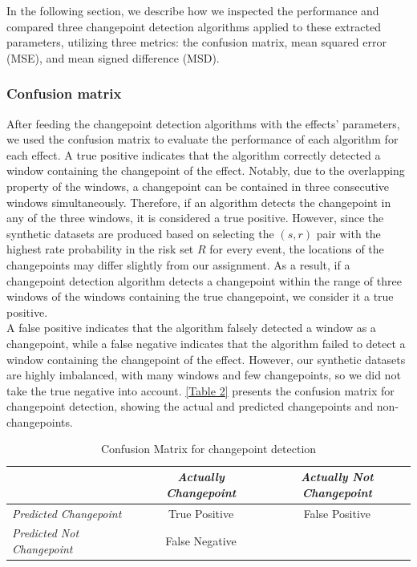 \documentclass[]{interact}
\theoremstyle{plain}%
\theoremstyle{definition}
\theoremstyle{remark}
\begin{document}
{	In the following section, we describe how we inspected the performance and compared three changepoint detection algorithms applied to these extracted parameters, utilizing three metrics: the confusion matrix, mean squared error (MSE), and mean signed difference (MSD). %
	
	\subsubsection{Confusion matrix}
	
	\hspace{0.28cm} After feeding the changepoint detection algorithms with the effects' parameters, we used the confusion matrix to evaluate the performance of each algorithm for each effect. A true positive indicates that the algorithm correctly detected a window containing the changepoint of the effect. Notably, due to the overlapping property of the windows, a changepoint can be contained in three consecutive windows simultaneously. Therefore, if an algorithm detects the changepoint in any of the three windows, it is considered a true positive. However, since the synthetic datasets are produced based on selecting the $(s,r)$ pair with the highest rate probability in the risk set $R$ for every event, the locations of the changepoints may differ slightly from our assignment. As a result, if a changepoint detection algorithm detects a changepoint within the range of three windows of the windows containing the true changepoint, we consider it a true positive. \\
	
	A false positive indicates that the algorithm falsely detected a window as a changepoint, while a false negative indicates that the algorithm failed to detect a window containing the changepoint of the effect. However, our synthetic datasets are highly imbalanced, with many windows and few changepoints, so we did not take the true negative into account. \autoref{Table 2} presents the confusion matrix for changepoint detection, showing the actual and predicted changepoints and non-changepoints. \\
	
	\begin{table}[h]
	\centering
	\renewcommand{\arraystretch}{1.5} %
	\small
	\begin{tabular}{l|c|c}
		\hline
		& \textit{Actually Changepoint} & \textit{Actually Not Changepoint}                   \\ \hline
		\textit{Predicted Changepoint} & True Positive              & False Positive                               \\ \hline
		\textit{Predicted Not Changepoint} & False Negative             & \multicolumn{1}{l}{\cellcolor[HTML]{C0C0C0}} \\ \hline
	\end{tabular}
	\caption{Confusion Matrix for changepoint detection}
	\label{Table 3}
    \end{table}
	
}
\end{document}
